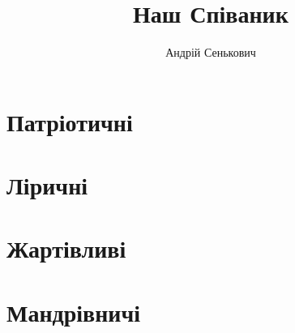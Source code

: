 \documentclass[a4paper]{book}
\title{Наш Співаник}
\author{Андрій Сенькович}
\begin{document}
\maketitle
\tableofcontents
\chapter{Патріотичні}



\chapter{Ліричні}
\chapter{Жартівливі}

\chapter{Мандрівничі}
\tableofcontents
\end{document}
